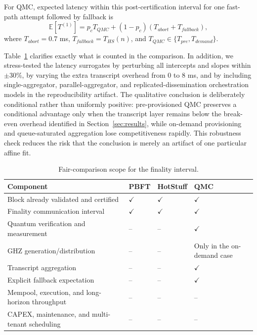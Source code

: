 \documentclass{ieeeaccess}
\begin{document}
For QMC, expected latency within this post-certification interval for one fast-path attempt followed by fallback is
\begin{equation}
\mathbb{E}[T^{(1)}] = p_c T_{QMC} + (1-p_c)(T_{abort}+T_{fallback}),
\label{eq:et}
\end{equation}
where $T_{abort}=0.7$ ms, $T_{fallback}=T_{HS}(n)$, and $T_{QMC}\in\{T_{pre},T_{demand}\}$.

Table~\ref{tab:fair} clarifies exactly what is counted in the comparison. In addition, we stress-tested the latency surrogates by perturbing all intercepts and slopes within $\pm 30\%$, by varying the extra transcript overhead from $0$ to $8$ ms, and by including single-aggregator, parallel-aggregator, and replicated-dissemination orchestration models in the reproducibility artifact. The qualitative conclusion is deliberately conditional rather than uniformly positive: pre-provisioned QMC preserves a conditional advantage only when the transcript layer remains below the break-even overhead identified in Section~\ref{sec:results}, while on-demand provisioning and queue-saturated aggregation lose competitiveness rapidly. This robustness check reduces the risk that the conclusion is merely an artifact of one particular affine fit.

\begin{table}[!t]
\caption{Fair-comparison scope for the finality interval.}
\label{tab:fair}
\centering
\scriptsize
\setlength{\tabcolsep}{3.6pt}
\renewcommand{\arraystretch}{1.15}
\begin{tabularx}{\columnwidth}{@{}>{\raggedright\arraybackslash}p{2.55cm}>{\centering\arraybackslash}p{0.82cm}>{\centering\arraybackslash}p{1.02cm}>{\raggedright\arraybackslash}X@{}}
\toprule
\textbf{Component} & \textbf{PBFT} & \textbf{HotStuff} & \textbf{QMC} \\
\midrule
Block already validated and certified & $\checkmark$ & $\checkmark$ & $\checkmark$ \\
Finality communication interval & $\checkmark$ & $\checkmark$ & $\checkmark$ \\
Quantum verification and measurement & -- & -- & $\checkmark$ \\
GHZ generation/distribution & -- & -- & Only in the on-demand case \\
Transcript aggregation & -- & -- & $\checkmark$ \\
Explicit fallback expectation & -- & -- & $\checkmark$ \\
Mempool, execution, and long-horizon throughput & -- & -- & -- \\
CAPEX, maintenance, and multi-tenant scheduling & -- & -- & -- \\
\bottomrule
\end{tabularx}
\end{table}
\end{document}

